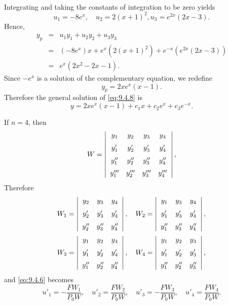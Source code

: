 \begin{examplesolution}
\begin{eqnarray*}
\end{eqnarray*}
Integrating and taking the constants of integration to be zero yields
\[
  u_{1}=-8e^{x},\quad u_{2}=2(x+1)^{2},u_{3}=e^{2x}(2x-3).
\]
Hence,
\begin{eqnarray*}
  y_{p} & = & u_{1}y_{1}+u_{2}y_{2}+u_{3}y_{3}                             \\
        & = & (-8e^{x})x+e^{x}(2(x+1)^{2})+e^{-x}\left(e^{2x}(2x-3)\right) \\
        & = & e^{x}(2x^{2}-2x-1).
\end{eqnarray*}
Since $-e^{x}$ is a solution of the complementary equation, we redefine
\[
  y_{p}=2xe^{x}(x-1).
\]
Therefore the general solution of \eqref{eq:9.4.8} is
\[
  y=2xe^{x}(x-1)+c_{1}x+c_{2}e^{x}+c_{3}e^{-x}.
\]
\end{examplesolution}


\noindent
If $n=4$, then
\[
  W=\left|
  \begin{array}{cccc}
    y_{1}    & y_{2}    & y_{3}    & y_{4}    \\[2\jot]
    y'_{1}   & y'_{2}   & y'_{3}   & y_{4}'   \\[2\jot]
    y''_{1}  & y''_{2}  & y''_{3}  & y_{4}''  \\[2\jot]
    y'''_{1} & y'''_{2} & y'''_{3} & y_{4}'''
  \end{array}\right|,
\]
Therefore
\[
  W_{1}=\left|
  \begin{array}{ccc}
    y_{2}   & y_{3}   & y_{4}   \\[2\jot]
    y'_{2}  & y'_{3}  & y_{4}'  \\[2\jot]
    y''_{2} & y''_{3} & y_{4}''
  \end{array}\right|, \quad W_{2}=\left|
  \begin{array}{ccc}
    y_{1}   & y_{3}   & y_{4}   \\[2\jot]
    y'_{1}  & y'_{3}  & y_{4}'  \\[2\jot]
    y''_{1} & y''_{3} & y_{4}''
  \end{array}\right|,
\]
\vskip5pt
\[
  W_{3}=\left|
  \begin{array}{ccc}
    y_{1}   & y_{2}   & y_{4}   \\[2\jot]
    y'_{1}  & y'_{2}  & y_{4}'  \\[2\jot]
    y''_{1} & y''_{2} & y_{4}''
  \end{array}\right|,\quad W_{4}=\left|
  \begin{array}{ccc}
    y_{1}   & y_{2}   & y_{3}   \\[2\jot]
    y_{1}'  & y'_{2}  & y_{3}'  \\[2\jot]
    y_{1}'' & y''_{2} & y_{3}''
  \end{array}\right|,
\]
and \eqref{eq:9.4.6} becomes
\begin{equation}
  \label{eq:9.4.9}u'_{1}=-\frac{FW_{1}}{P_{0}W},\quad u'_{2}=\frac{FW_{2}}{P_{0}W},\quad u'_{3}=-\frac{FW_{3}}{P_{0}W},\quad u'_{4}=\frac{FW_{4}}{P_{0}W}.
\end{equation}

